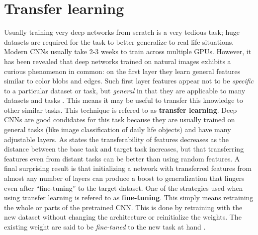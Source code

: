 \section{Transfer learning}
Usually training very deep networks from scratch is a very tedious task; huge datasets are required for the task to better generalize to real life situations. Modern CNNs usually take 2-3 weeks to train across multiple GPUs. However, it has been revealed that deep networks trained on natural images exhibits a curious phenomenon in common: on the first layer they learn general features similar to color blobs and edges. Such first layer features appear not to be \emph{specific} to a particular dataset or task, but \emph{general} in that they are applicable to many datasets and tasks \cite{Transfer}. This means it may be useful to transfer this knowledge to other similar tasks. This technique is refered to as \textbf{transfer learning}. Deep CNNs are good condidates for this task because they are usually trained on general tasks (like image classification of daily life objects) and have many adjustable layers. As \cite{Transfer} states the transferability of features decreases as the distance between the base task and target task increases, but that transferring features even from distant tasks can be better than using random features. A final surprising result is that initializing a network with transferred features from almost any number of layers can produce a boost to generalization that lingers even after ``fine-tuning'' to the target dataset. One of the strategies used when using transfer learning is refered to as \textbf{fine-tuning}.
This simply means retraining the whole or parts of the pretrained CNN. This is done by retraining with the new dataset without changing the architecture or reinitialize the weights. The existing weight are said to be \emph{fine-tuned} to the new task at hand \cite{ntnu}.
